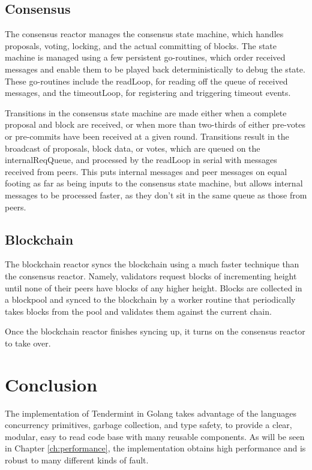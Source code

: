 \subsection{Consensus}

The consensus reactor manages the consensus state machine, which handles proposals, voting, locking, 
and the actual committing of blocks.
The state machine is managed using a few persistent go-routines, 
which order received messages and enable them to be played back deterministically to debug the state.
These go-routines include the readLoop, for reading off the queue of received messages, 
and the timeoutLoop, for registering and triggering timeout events. 

Transitions in the consensus state machine are made either when a complete proposal and block are received,
or when more than two-thirds of either pre-votes or pre-commits have been received at a given round.
Transitions result in the broadcast of proposals, block data, or votes, which are queued on the internalReqQueue,
and processed by the readLoop in serial with messages received from peers.
This puts internal messages and peer messages on equal footing as far as being inputs to the consensus state machine, 
but allows internal messages to be processed faster, as they don't sit in the same queue as those from peers.

\subsection{Blockchain}

The blockchain reactor syncs the blockchain using a much faster technique than the consensus reactor.
Namely, validators request blocks of incrementing height until none of their peers have blocks of any higher height.
Blocks are collected in a blockpool and synced to the blockchain by a worker routine that periodically takes blocks from the pool
and validates them against the current chain.

Once the blockchain reactor finishes syncing up, it turns on the consensus reactor to take over.

\section{Conclusion}

The implementation of Tendermint in Golang takes advantage of the languages concurrency primitives, garbage collection, 
and type safety, to provide a clear, modular, easy to read code base with many reusable components. 
As will be seen in Chapter \ref{ch:performance}, the implementation obtains high performance and is robust to many different kinds of fault.
